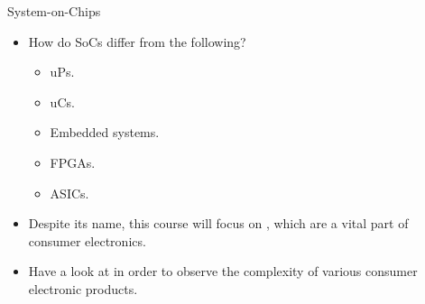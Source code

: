 \documentclass[]{slides}
\begin{document}
\begin{frame}{System-on-Chips}
\begin{itemize}
\item How do \acp{SoC} differ from the following?\pauseprint
  \begin{itemize}
    \item \acfp{uP}.\pauseprint
    \item \acfp{uC}.\pauseprint
    \item Embedded systems.\pauseprint
    \item \acfp{FPGA}.\pauseprint
    \item \acfp{ASIC}.
  \end{itemize}
  \pauseprint
\item Despite its name, this course will focus on , which are a vital part of consumer electronics.\pauseprint
\item Have a look at  in order to observe the complexity of various consumer electronic products.
\end{itemize}
\end{frame}
\end{document}

